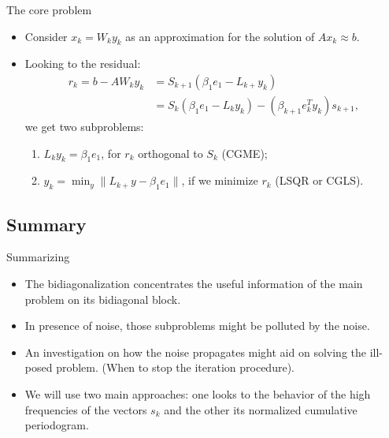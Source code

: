 \documentclass{beamer}
\begin{document}
\begin{frame}{The core problem}
  \begin{itemize}
    \item Consider $x_{k} = W_{k}y_{k}$ as an approximation for the solution of
      $Ax_{k} \approx b$.

    \item Looking to the residual:
      \begin{align*}
	r_{k} = b - AW_{k}y_{k} &= S_{k+1}(\beta_{1}e_{1} - L_{k+}y_{k}) \\
	&= S_{k}(\beta_{1}e_{1} - L_{k}y_{k}) - 
	(\beta_{k+1}e_{k}^{T}y_{k})s_{k+1},
      \end{align*}
      we get two subproblems:
      \begin{enumerate}
        \item $L_{k}y_{k} = \beta_{1}e_{1}$, for $r_{k}$ orthogonal to $S_{k}$
	  (CGME);
        \item $y_{k} = \min_{y}\|L_{k+}y - \beta_{1}e_{1}\|$, if we minimize 
	  $r_k$ (LSQR or CGLS).
      \end{enumerate}
  \end{itemize}
\end{frame}

\subsection{Summary}
\begin{frame}{Summarizing}
  \begin{itemize}
    \item The bidiagonalization concentrates the useful information of the
      main problem on its bidiagonal block.
      
    \item In presence of noise, those subproblems might be polluted by the
      noise.

    \item An investigation on how the noise propagates might aid on solving the
      ill-posed problem. (When to stop the iteration procedure).

    \item We will use two main approaches: one looks to the behavior of the
      high frequencies of the vectors $s_{k}$ and the other its normalized
      cumulative periodogram.
  \end{itemize}
\end{frame}
\end{document}
